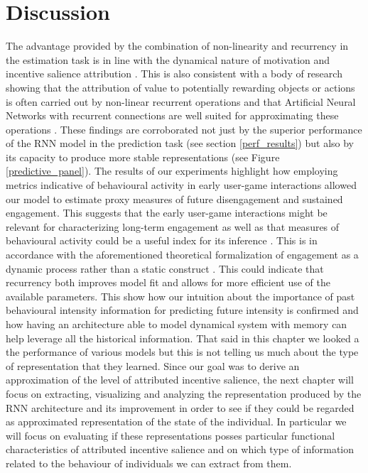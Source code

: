 \section{Discussion}
The advantage provided by the combination of non-linearity and recurrency in the estimation task is in line with the dynamical nature of motivation and incentive salience attribution \cite{toates1994comparing,robinson1993neural,zhang2009neural,tindell2009dynamic,berridge2012prediction}. This is also consistent with a body of research showing that the attribution of value to potentially rewarding objects or actions is often carried out by non-linear recurrent operations \cite{song2017reward,wang2018prefrontal} and that Artificial Neural Networks with recurrent connections are well suited for approximating these operations \cite{kietzmann2018deep}. These findings are corroborated not just by the superior performance of the RNN model in the prediction task (see section \ref{perf_results}) but also by its capacity to produce more stable representations (see Figure \ref{predictive_panel}).
The results of our experiments highlight how employing metrics indicative of behavioural activity in early user-game interactions allowed our model to estimate proxy measures of future disengagement and sustained engagement. This suggests that the early user-game interactions might be relevant for characterizing long-term engagement as well as that measures of behavioural activity could be a useful index for its inference \cite{milovsevic2017early, mirza2013does}.
This is in accordance with the aforementioned theoretical formalization of engagement as a dynamic process rather than a static construct \cite{o2008user}. 
This could indicate that recurrency both improves model fit and allows for more efficient use of the available parameters.
This show how our intuition about the importance of past behavioural intensity information for predicting future intensity is confirmed and how having an architecture able to model dynamical system with memory can help leverage all the historical information. That said in this chapter we looked a the performance of various models but this is not telling us much about the type of representation that they learned. Since our goal was to derive an approximation of the level of attributed incentive salience, the next chapter will focus on extracting, visualizing and analyzing the representation produced by the RNN architecture and its improvement in order to see if they could be regarded as approximated representation of the state of the individual. In particular we will focus on evaluating if these representations posses particular functional characteristics of attributed incentive salience and on which type of information related to the behaviour of individuals we can extract from them.

